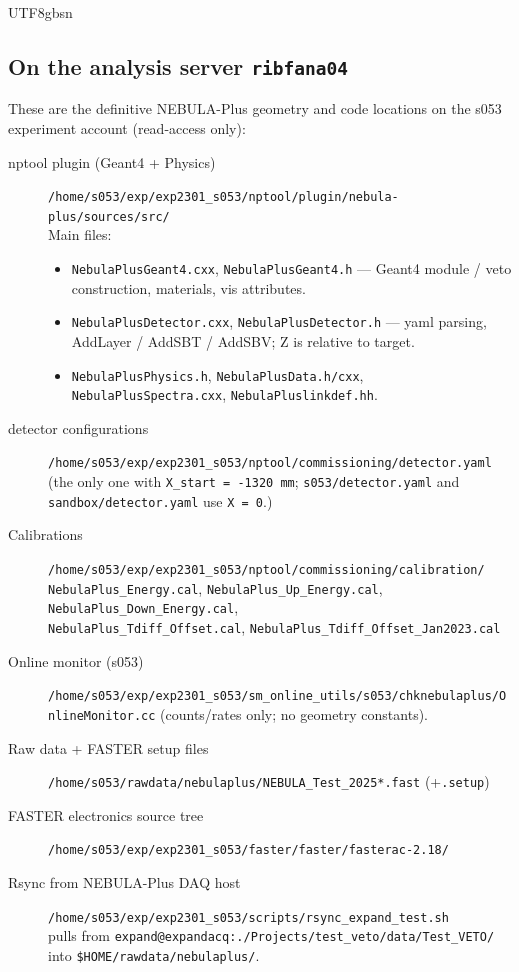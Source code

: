 \documentclass[11pt,a4paper]{article}
\newcommand{\NPL}{NEBULA-Plus}
\begin{document}
\begin{CJK}{UTF8}{gbsn}
\subsection{On the analysis server \texttt{ribfana04}}

These are the definitive \NPL{} geometry and code locations on the s053
experiment account (read-access only):

\begin{description}
  \item[nptool plugin (Geant4 + Physics)]
    \texttt{/home/s053/exp/exp2301\_s053/nptool/plugin/nebula-plus/sources/src/} \\
    Main files:
    \begin{itemize}
      \item \texttt{NebulaPlusGeant4.cxx}, \texttt{NebulaPlusGeant4.h}
            --- Geant4 module / veto construction, materials, vis attributes.
      \item \texttt{NebulaPlusDetector.cxx}, \texttt{NebulaPlusDetector.h}
            --- yaml parsing, AddLayer / AddSBT / AddSBV; Z is relative to target.
      \item \texttt{NebulaPlusPhysics.h}, \texttt{NebulaPlusData.h/cxx},
            \texttt{NebulaPlusSpectra.cxx}, \texttt{NebulaPluslinkdef.hh}.
    \end{itemize}
  \item[detector configurations]
    \texttt{/home/s053/exp/exp2301\_s053/nptool/commissioning/detector.yaml}
    (the only one with \texttt{X\_start = -1320\,mm}; \texttt{s053/detector.yaml}
    and \texttt{sandbox/detector.yaml} use \texttt{X = 0}.)
  \item[Calibrations]
    \texttt{/home/s053/exp/exp2301\_s053/nptool/commissioning/calibration/}\\
    \quad \texttt{NebulaPlus\_Energy.cal},
    \texttt{NebulaPlus\_Up\_Energy.cal},
    \texttt{NebulaPlus\_Down\_Energy.cal},\\
    \quad \texttt{NebulaPlus\_Tdiff\_Offset.cal},
    \texttt{NebulaPlus\_Tdiff\_Offset\_Jan2023.cal}
  \item[Online monitor (s053)]
    \texttt{/home/s053/exp/exp2301\_s053/sm\_online\_utils/s053/chknebulaplus/OnlineMonitor.cc}
    (counts/rates only; no geometry constants).
  \item[Raw data + FASTER setup files]
    \texttt{/home/s053/rawdata/nebulaplus/NEBULA\_Test\_2025*.fast} (+\texttt{.setup})
  \item[FASTER electronics source tree]
    \texttt{/home/s053/exp/exp2301\_s053/faster/faster/fasterac-2.18/}
  \item[Rsync from \NPL{} DAQ host]
    \texttt{/home/s053/exp/exp2301\_s053/scripts/rsync\_expand\_test.sh}
    \\ pulls from \texttt{expand@expandacq:./Projects/test\_veto/data/Test\_VETO/} into
    \texttt{\$HOME/rawdata/nebulaplus/}.
\end{description}


\end{CJK}
\end{document}

